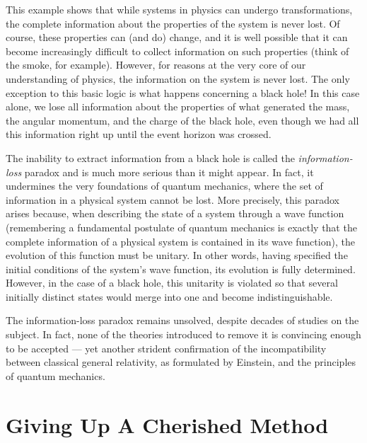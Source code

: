 This example shows that while systems in physics can undergo transformations, the
complete information about the properties of the system is never lost. Of course, these
properties can (and do) change, and it is well possible that it can become increasingly
difficult to collect information on such properties (think of the smoke, for example).
However, for reasons at the very core of our understanding of physics, the information
on the system is never lost. The only exception to this basic logic is what happens
concerning a black hole! In this case alone, we lose all information about the
properties of what generated the mass, the angular momentum, and the charge of the black
hole, even though we had all this information right up until the event horizon was
crossed.

The inability to extract information from a black hole is called the
\emph{information-loss} paradox and is much more serious than it might
appear. In fact, it undermines the very foundations of quantum
mechanics, where the set of information in a physical system cannot be
lost. More precisely, this paradox arises because, when describing the state of a system
through a wave function (remembering a fundamental postulate of quantum mechanics is
exactly that the complete information of a physical system is contained in its wave
function), the evolution of this function must be unitary. In other words, having
specified the initial conditions of the system's wave function, its evolution is fully
determined. However, in the case of a black hole, this unitarity is violated so that
several initially distinct states would merge into one and become indistinguishable.

The information-loss paradox remains unsolved, despite decades of studies on the
subject. In fact, none of the theories introduced to remove it is convincing enough to
be accepted --- yet another strident confirmation of the incompatibility between
classical general relativity, as formulated by Einstein, and the principles of quantum
mechanics.

\section{Giving Up A Cherished Method}\label{sec:06-method}

